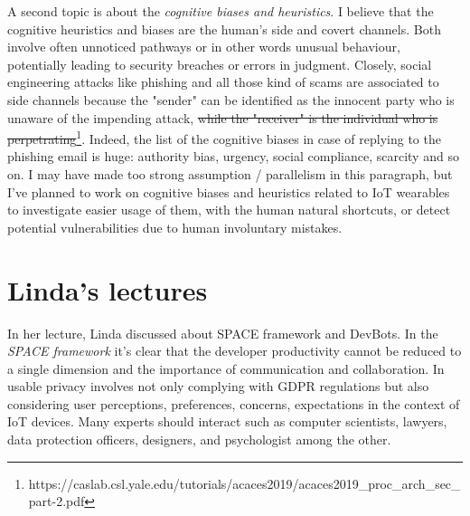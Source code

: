 \documentclass[11pt]{article}
\begin{document}
A second topic is about the \textit{cognitive biases and heuristics}. I believe that the cognitive heuristics and biases are the human's side and covert channels. Both involve often unnoticed pathways or in other words unusual behaviour, potentially leading to security breaches or errors in judgment. Closely, social engineering attacks like phishing and all those kind of scams are associated to side channels because the "sender" can be identified as the innocent party who is unaware of the impending attack, \sout{while the "receiver" is the individual who is perpetrating}\footnote{https://caslab.csl.yale.edu/tutorials/acaces2019/acaces2019\_proc\_arch\_sec\_part-2.pdf}. Indeed, the list of the cognitive biases in case of replying to the phishing email is huge: authority bias, urgency, social compliance, scarcity and so on. I may have made too strong assumption / parallelism in this paragraph, but I've planned to work on cognitive biases and heuristics related to IoT wearables to investigate easier usage of them, with the human natural shortcuts, or detect potential vulnerabilities due to human involuntary mistakes.

\section{Linda's lectures}\label{sec:3}
In her lecture, Linda discussed about SPACE framework and DevBots. In the \textit{SPACE framework} it's clear that the developer productivity cannot be reduced to a single dimension and the importance of communication and collaboration. In usable privacy involves not only complying with GDPR regulations but also considering user perceptions, preferences, concerns, expectations in the context of IoT devices. Many experts should interact such as computer scientists, lawyers, data protection officers, designers, and psychologist among the other.
\end{document}
